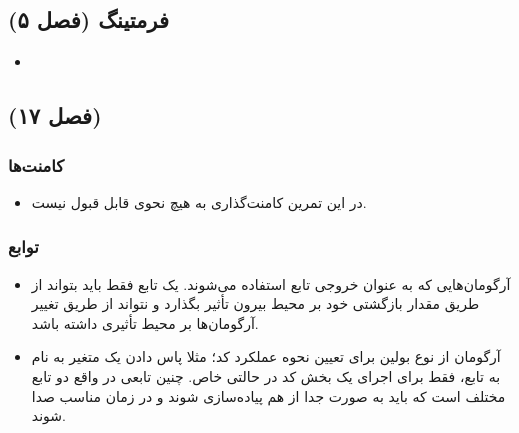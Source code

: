 \documentclass{utap}
\begin{document}
\subsection{فرمتینگ (فصل ۵)}
  \begin{itemize}
        \item 
    \end{itemize}


\subsection{ (فصل ۱۷)}

	\subsubsection{کامنت‌ها}
	  \begin{itemize}
	        \item در این تمرین کامنت‌گذاری به هیچ نحوی قابل قبول نیست.
	    \end{itemize}


	\subsubsection{توابع}
	  \begin{itemize}
	        \item آرگومان‌هایی که به عنوان خروجی تابع استفاده می‌شوند. یک تابع فقط باید بتواند از طریق مقدار بازگشتی خود بر محیط بیرون تأثیر بگذارد و نتواند از طریق تغییر آرگومان‌ها بر محیط تأثیری داشته باشد.
		\item آرگومان از نوع بولین برای تعیین نحوه عملکرد کد؛
مثلا پاس دادن یک متغیر به نام  به تابع، فقط برای اجرای یک بخش کد در حالتی خاص. چنین تابعی در واقع دو تابع مختلف است که باید به صورت جدا از هم پیاده‌سازی شوند و در زمان مناسب صدا شوند.
	    \end{itemize}
\end{document}
